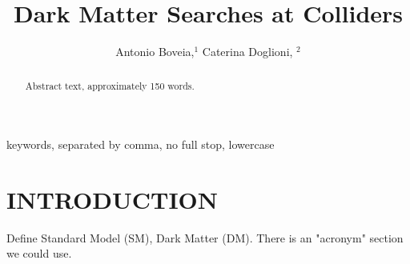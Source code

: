 \documentclass{ar-1col}
\begin{document}

\title{Dark Matter Searches at Colliders}

\newcommand{\chiDM}{\ensuremath{\chi}\xspace}
\newcommand{\mMed}{\ensuremath{M_{\rm{med}}}\xspace}
\newcommand{\mmed}{\mMed}
\newcommand{\gDM}{\ensuremath{g_{\chiDM}}\xspace}
\newcommand{\gdm}{\gDM}
\newcommand{\gl}{$g_{\mathrm{l}}$\xspace}
\newcommand{\gdmq}{\ensuremath{g_{\chiDM q}}\xspace}
\newcommand{\gq}{$g_{\mathrm{q}}$\xspace}
\newcommand{\ifb}{\ensuremath{\mathrm{fb}^{-1}}\xspace}
\newcommand{\mdm}{\ensuremath{m_{\chiDM}}\xspace}
\newcommand{\mDM}{\mdm}
\newcommand{\ghZprimeZprime}{\ensuremath{g_{hZ'Z'}}\xspace}
\newcommand{\gZPrime}{\ensuremath{g_{Z'}}\xspace}
\newcommand{\gZprime}{\ensuremath{g_{Z'}}\xspace}
\newcommand{\sinthetab}{\ensuremath{sin(\theta_B}\xspace}
\newcommand{\sinthetahS}{\ensuremath{sin(\theta_{hS}}\xspace}
\newcommand{\pt}{\ensuremath{p_\mathrm{T}}\xspace}
\newcommand{\pT}{\ensuremath{p_\mathrm{T}}\xspace}
\newcommand{\MET}{\ensuremath{\slashed{E}_T}\xspace}


\author{Antonio Boveia,$^1$ Caterina Doglioni, $^2$
}

\begin{abstract}
Abstract text, approximately 150 words. 
\end{abstract}

\begin{keywords}
keywords, separated by comma, no full stop, lowercase
\end{keywords}
\maketitle

\tableofcontents


\section{INTRODUCTION}
\label{sec:intro}

Define Standard Model (SM), Dark Matter (DM). There is an "acronym" section we could use. 


%
\end{document}
